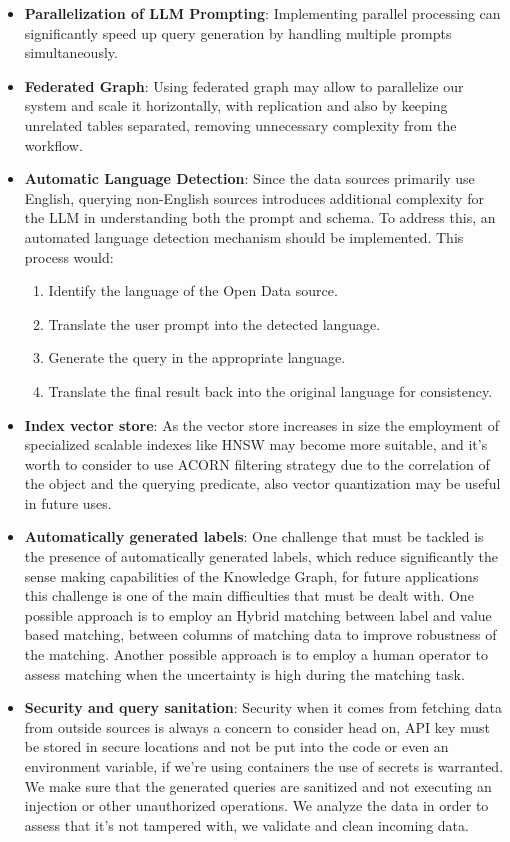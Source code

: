 \begin{itemize}
    \item \textbf{Parallelization of LLM Prompting}: Implementing parallel processing can significantly speed up query generation by handling multiple prompts simultaneously.  
    \item \textbf{Federated Graph}: Using federated graph may allow to parallelize our system and scale it horizontally, with replication and also by keeping unrelated tables separated, removing unnecessary complexity from the workflow.
    \item \textbf{Automatic Language Detection}: Since the data sources primarily use English, querying non-English sources introduces additional complexity for the LLM in understanding both the prompt and schema. To address this, an automated language detection mechanism should be implemented. This process would:
    \begin{enumerate}
        \item Identify the language of the Open Data source.
        \item Translate the user prompt into the detected language.
        \item Generate the query in the appropriate language.
        \item Translate the final result back into the original language for consistency.
    \end{enumerate}
    \item  \textbf{Index vector store}: As the vector store increases in size the employment of specialized scalable indexes like HNSW may become more suitable, and it's worth to consider to use ACORN filtering strategy due to the correlation of the object and the querying predicate, also vector quantization may be useful in future uses.
    \item  \textbf{Automatically generated labels}: One challenge that must be tackled is the presence of automatically generated labels, which reduce significantly the sense making capabilities of the Knowledge Graph, for future applications this challenge is one of the main difficulties that must be dealt with. One possible approach is to employ an Hybrid matching between label and value based matching, between columns of matching data to improve robustness of the matching. Another possible approach is to employ a human operator to assess matching when the uncertainty is high during the matching task.
    \item \textbf{Security and query sanitation}: Security when it comes from fetching data from outside sources is always a concern to consider head on, API key must be stored in secure locations and not be put into the code or even an environment variable, if we're using containers the use of secrets is warranted. We make sure that the generated queries are sanitized and not executing an injection or other unauthorized operations. We analyze the data in order to assess that it's not tampered with, we validate and clean incoming data.

\end{itemize}
